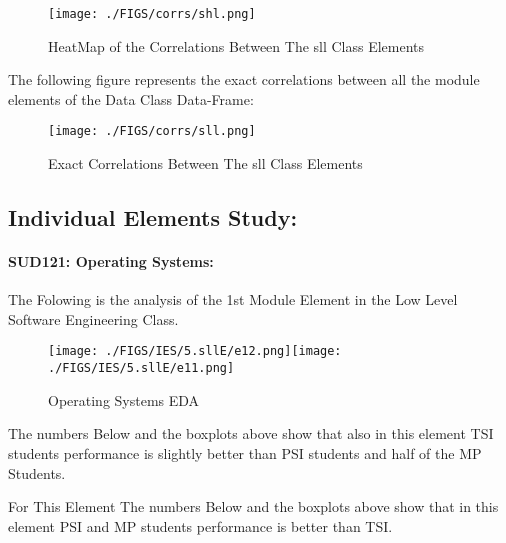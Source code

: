 \documentclass[12pt]{extreport}
\begin{document}
\begin{figure}[H]
	\centering
	\texttt{[image: ./FIGS/corrs/shl.png]}
	\caption{HeatMap of the Correlations Between The sll Class Elements}
	\label{fig:59}
\end{figure}


The following figure represents the exact correlations between all the module elements of the Data Class Data-Frame:

\begin{figure}[H]
	\centering
	\texttt{[image: ./FIGS/corrs/sll.png]}
	\caption{Exact Correlations Between The sll Class Elements}
	\label{fig:60}
\end{figure}


\subsection{Individual Elements Study:}


\paragraph{\large SUD121: Operating Systems:\\
 } 
The Folowing is the analysis of the 1st Module Element in the Low Level Software Engineering Class.

\begin{figure}[H]
	\centering
	\texttt{[image: ./FIGS/IES/5.sllE/e12.png]}\texttt{[image: ./FIGS/IES/5.sllE/e11.png]}
	\caption{Operating Systems EDA}
	\label{fig:61}
\end{figure}

The numbers Below and the boxplots above show that also in this element  TSI students performance is slightly better than PSI students and half of the MP Students.

For This Element The numbers Below and the boxplots above show that in this element  PSI and MP students performance is  better than TSI.
\end{document}
